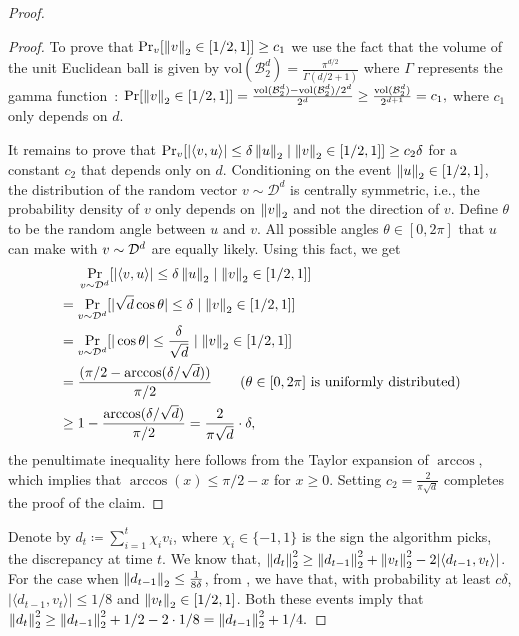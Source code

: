 \begin{proof}
\begin{proof}
    To prove that $\Pr_v[\left\lVert v\right\rVert_2 \in [1/2,1]] \geq c_1$ we use the fact that the volume of the unit Euclidean ball is given by $\textrm{vol}(\mathcal{B}^d_2) = \frac{\pi^{d/2}}{\Gamma(d/2+1)}$ where $\Gamma$ represents the gamma function~\cite{smith1989small}:
    $\Pr[\left\lVert v\right\rVert_2 \in [1/2,1]] = \frac{\textrm{vol}(\mathcal{B}^d_2) - \textrm{vol}(\mathcal{B}^d_2)/2^d}{2^d} \geq \frac{\textrm{vol}(\mathcal{B}^d_2)}{2^{d+1}} = c_1,$
    where $c_1$ only depends on $d$. 
    
    It remains to prove that $\Pr_v[|\langle v, u\rangle| \leq \delta \left\lVert u\right\rVert_2 \mid \left\lVert v\right\rVert_2 \in [1/2,1]] \geq c_2 \delta$ for a constant $c_2$ that depends only on $d$. Conditioning on the event $\left\lVert u\right\rVert_2 \in [1/2,1]$, the distribution of the random vector $v \sim \mathcal{D}^d$ is centrally symmetric, i.e., the probability density of $v$ only depends on $\left\lVert v\right\rVert_2$ and not the direction of $v$. Define $\theta$ to be the random angle between $u$ and $v$. All possible angles $\theta \in [0, 2\pi]$ that $u$ can make with $v \sim \mathcal{D}^d$ are equally likely. Using this fact, we get
        \begin{align*}
 &\phantom{{}={}}\Pr_{v \sim \dist^d}[|\langle v, u\rangle| \leq \delta \norm{u}_2 \mid \norm{v}_2 \in [1/2,1]] \\
 & =  \Pr_{v \sim \dist^d}[ | \sqrt{d} \cos{\theta} | \leq \delta  \mid \norm{v}_2 \in [1/2,1]]\\
  & =  \Pr_{v \sim \dist^d}[ | \cos{\theta} | \leq \frac{\delta}{\sqrt{d}}  \mid \norm{v}_2 \in [1/2,1]]\\
  & =  \frac{(\pi/2 - \arccos(\delta/\sqrt{d}))}{\pi/2} \tag{$\theta \in [0, 2\pi]$ is uniformly distributed} \\
  & \geq 1 - \frac{\arccos(\delta/\sqrt{d})}{\pi/2} = \frac{2}{\pi\sqrt{d}} \cdot \delta,
        \end{align*}
        the penultimate inequality here follows from the Taylor expansion of $\arccos$, which implies that $\arccos(x) \leq \pi/2 - x$ for $x \geq 0$. Setting $c_2 = \frac{2}{\pi\sqrt{d}}$ completes the proof of the claim.
    \end{proof}
    Denote by $d_t \coloneqq \sum_{i=1}^t \chi_i v_i$, where $\chi_i \in \{ -1, 1 \}$ is the sign the algorithm picks, the discrepancy at time $t$. We know that, $\left\lVert d_t\right\rVert_2^2 \geq \left\lVert d_{t-1}\right\rVert_2^2 + \left\lVert v_t\right\rVert_2^2 - 2|\langle d_{t-1}, v_t \rangle|$. For the case when $\left\lVert d_{t-1}\right\rVert_2 \leq \frac{1}{8 \delta}$, from , we have that, with probability at least $c \delta$, $|\langle d_{t-1}, v_t\rangle| \leq 1/8$ and $\left\lVert v_t\right\rVert_2 \in [1/2,1]$. Both these events imply that $\left\lVert d_t\right\rVert_2^2 \geq \left\lVert d_{t-1}\right\rVert_2^2 + 1/2 - 2\cdot 1/8 = \left\lVert d_{t-1}\right\rVert_2^2 + 1/4.$
    

\end{proof}
